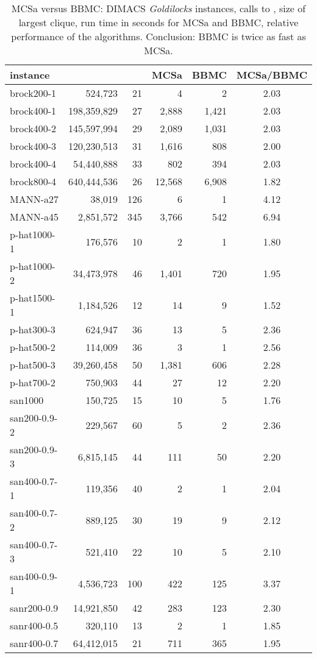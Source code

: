 \documentclass[runningheads]{llncs}
\begin{document}
\begin{table}
\begin{center}
\begin{scriptsize}
\begin{tabular}{|l | r r | r r |c|} \hline 
instance &  &  & MCSa & BBMC & MCSa/BBMC \\ \hline
brock200-1 & 524,723 & 21 & 4 & 2 & 2.03   \\ 
brock400-1 & 198,359,829 & 27 & 2,888 & 1,421 & 2.03   \\ 
brock400-2 & 145,597,994 & 29 & 2,089 & 1,031 & 2.03   \\ 
brock400-3 & 120,230,513 & 31 & 1,616 & 808 & 2.00   \\ 
brock400-4 & 54,440,888 & 33 & 802 & 394 & 2.03   \\ 
brock800-4 & 640,444,536 & 26 & 12,568 & 6,908 & 1.82   \\ 
MANN-a27 & 38,019 & 126 & 6 & 1 & 4.12   \\ 
MANN-a45 & 2,851,572 & 345 & 3,766 & 542 & 6.94   \\ 
p-hat1000-1 & 176,576 & 10 & 2 & 1 & 1.80   \\ 
p-hat1000-2 & 34,473,978 & 46 & 1,401 & 720 & 1.95   \\ 
p-hat1500-1 & 1,184,526 & 12 & 14 & 9 & 1.52   \\ 
p-hat300-3 & 624,947 & 36 & 13 & 5 & 2.36   \\ 
p-hat500-2 & 114,009 & 36 & 3 & 1 & 2.56   \\ 
p-hat500-3 & 39,260,458 & 50 & 1,381 & 606 & 2.28   \\ 
p-hat700-2 & 750,903 & 44 & 27 & 12 & 2.20   \\ 
san1000 & 150,725 & 15 & 10 & 5 & 1.76   \\ 
san200-0.9-2 & 229,567 & 60 & 5 & 2 & 2.36   \\ 
san200-0.9-3 & 6,815,145 & 44 & 111 & 50 & 2.20   \\ 
san400-0.7-1 & 119,356 & 40 & 2 & 1 & 2.04   \\ 
san400-0.7-2 & 889,125 & 30 & 19 & 9 & 2.12   \\ 
san400-0.7-3 & 521,410 & 22 & 10 & 5 & 2.10   \\ 
san400-0.9-1 & 4,536,723 & 100 & 422 & 125 & 3.37   \\ 
sanr200-0.9 & 14,921,850 & 42 & 283 & 123 & 2.30   \\ 
sanr400-0.5 & 320,110 & 13 & 2 & 1 & 1.85   \\ 
sanr400-0.7 & 64,412,015 & 21 & 711 & 365 & 1.95   \\ \hline
\end{tabular}
\end{scriptsize}
\end{center}
\caption{MCSa versus BBMC: DIMACS \emph{Goldilocks} instances, calls to , size of largest clique, run time in seconds for MCSa and BBMC, 
relative performance of the algorithms. Conclusion: BBMC is twice as fast as MCSa.}
\label{tableMCSvBBMC}
\end{table}
\end{document}
